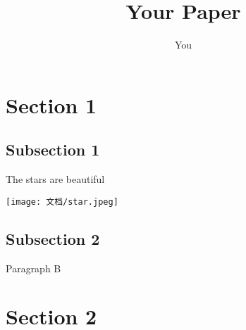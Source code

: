 \documentclass{article}
\title{Your Paper}
\author{You}
\begin{document}
\maketitle

\section{Section 1}

\subsection{Subsection 1}
The stars are beautiful

\texttt{[image: 文档/star.jpeg]}

\subsection{Subsection 2}
Paragraph B

\section{Section 2}
\end{document}
